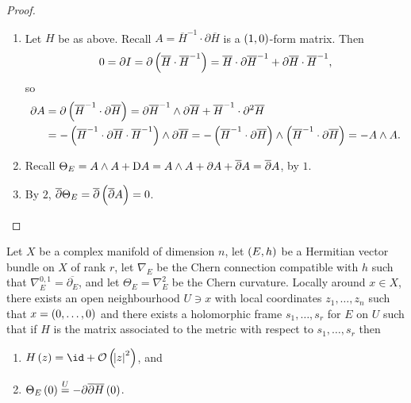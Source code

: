 \begin{proof}
\hfill
\begin{enumerate}
\item Let $ H $ be as above. Recall $ A = \overline{H}^{-1} \cdot \partial\overline{H} $ is a $ \br{1, 0} $-form matrix. Then
$$ 0 = \partial I = \partial\br{\overline{H} \cdot \overline{H}^{-1}} = \overline{H} \cdot \partial\overline{H}^{-1} + \partial\overline{H} \cdot \overline{H}^{-1}, $$
so
\begin{align*}
\partial A
& = \partial\br{\overline{H}^{-1} \cdot \partial\overline{H}}
= \partial\overline{H}^{-1} \wedge \partial\overline{H} + \overline{H}^{-1} \cdot \partial^2\overline{H} \\
& = -\br{\overline{H}^{-1} \cdot \partial\overline{H} \cdot \overline{H}^{-1}} \wedge \partial\overline{H}
= -\br{\overline{H}^{-1} \cdot \partial\overline{H}} \wedge \br{\overline{H}^{-1} \cdot \partial\overline{H}}
= -A \wedge A.
\end{align*}
\item Recall $ \Theta_E = A \wedge A + \mathrm{D} A = A \wedge A + \partial A + \overline{\partial}A = \overline{\partial}A $, by $ 1 $.
\item By $ 2 $, $ \overline{\partial}\Theta_E = \overline{\partial}\br{\overline{\partial}A} = 0 $.
\end{enumerate}
\end{proof}

\pagebreak

\begin{lemma}
Let $ X $ be a complex manifold of dimension $ n $, let $ \br{E, h} $ be a Hermitian vector bundle on $ X $ of rank $ r $, let $ \nabla_E $ be the Chern connection compatible with $ h $ such that $ \nabla_E^{0, 1} = \overline{\partial_E} $, and let $ \Theta_E = \nabla_E^2 $ be the Chern curvature. Locally around $ x \in X $, there exists an open neighbourhood $ U \ni x $ with local coordinates $ z_1, \dots, z_n $ such that $ x = \br{0, \dots, 0} $ and there exists a holomorphic frame $ s_1, \dots, s_r $ for $ E $ on $ U $ such that if $ H $ is the matrix associated to the metric with respect to $ s_1, \dots, s_r $ then
\begin{enumerate}
\item $ H\br{z} = \id + \OOO\br{\abs{z}^2} $, and
\item $ \Theta_E\br{0} \overset{U}{=} -\partial\overline{\partial}\overline{H}\br{0} $.
\end{enumerate}
\end{lemma}

